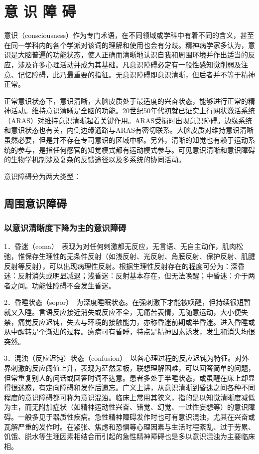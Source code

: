 \section{意 识 障 碍}

意识（consciousness）作为专门术语，在不同领域或学科中有着不同的含义，甚至在同一学科内的各个学派对该词的理解和使用也会有分歧。精神病学家多认为，意识是大脑普遍的功能状态，使人正确而清晰地认识自我和周围环境并作出适当的反应，涉及许多心理活动并成为其基础。凡意识障碍必定有一般性感知觉削弱及注意、记忆障碍，此乃最重要的指征。无意识障碍即意识清晰，但后者并不等于精神正常。

正常意识状态下，意识清晰，大脑皮质处于最适度的兴奋状态，能够进行正常的精神活动。维持意识清晰是全脑的功能。20世纪50年代初就已证实上行网状激活系统（ARAS）对维持意识清晰起着关键作用。ARAS受损时出现意识障碍。边缘系统和意识状态也有关，内侧边缘通路与ARAS有密切联系。大脑皮质对维持意识清晰虽然必要，但是并不存在专司意识的区域中枢。另外，清晰的知觉也有赖于运动系统的参与，是指任何感官的知觉模式都有运动模式参与。可见意识清晰和意识障碍的生物学机制涉及复杂的反馈途径以及多系统的协同活动。

意识障碍分为两大类型：

\subsection{周围意识障碍}

\subsubsection{以意识清晰度下降为主的意识障碍}

1．昏迷（coma）　表现为对任何刺激都无反应，无言语、无自主动作，肌肉松弛，惟保存生理性的无条件反射（如浅反射、光反射、角膜反射、保护反射、肌腱反射等反射），可以出现病理性反射。根据生理性反射存在的程度可分为：深昏迷：反射消失或明显减退；浅昏迷：反射基本存在，但无法唤醒；中昏迷：介于两者之间。功能性障碍不会发生昏迷。

2．昏睡状态（sopor）　为深度睡眠状态。在强刺激下才能被唤醒，但持续很短暂就又入睡。言语反应接近消失或反应不全，无痛苦表情，无随意运动，大小便失禁，痛觉反应迟钝，失去与环境的接触能力，亦称昏迷前期或半昏迷。进入昏睡或从中醒转是个渐进的过程。癔病可有昏睡，特点是精神因素诱发，发生和消失均很突然。

3．混浊（反应迟钝）状态（confusion）　以各心理过程的反应迟钝为特征。对外界刺激的反应阈值上升，表现为茫然呆板，联想理解困难，可以回答简单的问题，但常重复别人的问话或回答时词不达意。患者多处于半睡状态，或虽醒在床上却显得很迷惑，有定向障碍和发作后遗忘。广义上讲，从意识清晰到昏迷之间各种不同程度的意识障碍都可称为意识混浊。临床上常用其狭义，指的是以知觉清晰度减低为主，而无附加症状（如精神运动性兴奋、错觉、幻觉、一过性妄想等）的意识障碍。一般多见于器质性疾病。急性精神障碍发作时也可有意识混浊，尤其在兴奋或瓦解严重的发作时。在紧张、焦虑和恐惧等心理因素与生活时程紊乱、过于劳累、饥饿、脱水等生理因素相结合而引起的急性精神障碍也是多以意识混浊为主要临床相。

